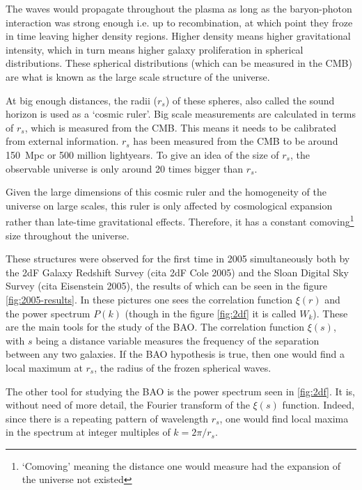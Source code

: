 The waves would propagate throughout the plasma as long as the baryon-photon interaction was strong enough i.e. up to recombination, at which point they froze in time leaving higher density regions. Higher density means higher gravitational intensity, which in turn means higher galaxy proliferation in spherical distributions. These spherical distributions (which can be measured in the CMB) are what is known as the large scale structure of the universe.

At big enough distances, the radii ($r_s$) of these spheres, also called the sound horizon is used as a `cosmic ruler'. Big scale measurements are calculated in terms of $r_s$, which is measured from the CMB. This means it needs to be calibrated from external information. $ r_s$ has been measured from the CMB to be around  \SI{150}{Mpc} or 500 million lightyears.
To give an idea of the size of $r_s$, the observable universe is only around 20 times bigger than  $r_s$.

Given the large dimensions of this cosmic ruler and the homogeneity of the universe on large scales, this ruler is only affected by cosmological expansion rather than late-time gravitational effects. Therefore, it has a constant comoving\footnote{`Comoving' meaning the distance one would measure had the expansion of the universe not existed} size throughout the universe.

These structures were observed for the first time in 2005 simultaneously both by the 2dF Galaxy Redshift Survey (cita 2dF Cole 2005) and the Sloan Digital Sky Survey (cita Eisenstein 2005), the results of which can be seen in the figure \ref{fig:2005-results}. In these pictures one sees the correlation function  $\xi(r)$ and the power spectrum $P(k)$ (though in the figure \ref{fig:2df} it is called $W_k$). These are the main tools for the study of the BAO.
The correlation function $\xi(s)$, with $s$ being a distance variable measures the frequency of the separation between any two galaxies. If the BAO hypothesis is true, then one would find a local maximum at $r_s$, the radius of the frozen spherical waves.

The other tool for studying the BAO is the power spectrum seen in \ref{fig:2df}. It is, without need of more detail, the Fourier transform of the $\xi(s)$ function. Indeed, since there is a repeating pattern of wavelength $r_s$, one would find local maxima in the spectrum at integer multiples of $k = 2\pi /r_s$.

